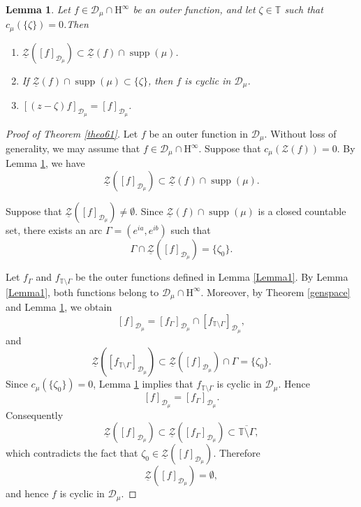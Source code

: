 \documentclass[12pt,reqno,a4paper]{amsart}
\newtheorem{lem}[prop]{Lemma}
\newcommand{\kH}{\mathrm{H^\infty  }}
\newcommand\TT{\mathbb{T}}
\DeclareMathOperator{\supp}{supp}
\newcommand{\cZ}{{\mathcal{Z}}}
\newcommand{\cD}{{\mathcal{D}}}
\numberwithin{equation}{section}
\begin{document}
	\begin{lem}\label{Lemma3}
		Let $f \in \cD_\mu \cap \kH$ be an outer function, and let $\zeta \in \TT$ such that $c_\mu(\{\zeta \})= 0$.Then\\
		
		\begin{enumerate}
			\item[A.] $\underline{\mathcal{Z}}([f]_{\cD_\mu}) \subset \underline{\mathcal{Z}}(f) \cap \supp(\mu)$.\\
			
			\item[B.] If $\underline{\mathcal{Z}}(f) \cap \supp(\mu) \subset \{\zeta\}$, then $f$ is cyclic in $\cD_\mu$.\\
			
			\item[C.] $[(z-\zeta)f]_{\cD_\mu}= [f]_{\cD_\mu}$.
		\end{enumerate}
	\end{lem}
	
	
	\begin{proof}[Proof of Theorem \ref{theo61}]
		
		Let $f$ be an outer function in $\cD_\mu$. Without loss of generality, we may assume that
		$f \in \cD_\mu \cap \kH$. Suppose that $c_\mu(\cZ(f))=0$. By Lemma \ref{Lemma3}, we have
		\[
		\underline{\mathcal Z}([f]_{\cD_\mu})
		\subset
		\underline{\mathcal Z}(f)\cap\supp(\mu).
		\]
		
		Suppose that
		$\underline{\mathcal Z}([f]_{\cD_\mu})\neq\emptyset$.
		Since
		$\underline{\mathcal Z}(f)\cap\supp(\mu)$
		is a closed countable set, there exists an arc
		$\Gamma=(e^{ia},e^{ib})$
		such that
		\[
		\Gamma\cap
		\underline{\mathcal Z}([f]_{\cD_\mu})
		=
		\{\zeta_0\}.
		\]
		
		Let $f_\Gamma$ and $f_{\TT\setminus\Gamma}$ be the outer functions defined in Lemma \ref{Lemma1}.
		By Lemma \ref{Lemma1}, both functions belong to $\cD_\mu\cap\kH$. Moreover, by
		Theorem \ref{genspace} and Lemma \ref{Lemma3}, we obtain
		\[
		[f]_{\cD_\mu}
		=
		[f_\Gamma]_{\cD_\mu}
		\cap
		[f_{\TT\setminus\Gamma}]_{\cD_\mu},
		\]
		and
		\[
		\underline{\mathcal Z}([f_{\TT\setminus\Gamma}]_{\cD_\mu})
		\subset
		\underline{\mathcal Z}([f]_{\cD_\mu})\cap\Gamma
		=
		\{\zeta_0\}.
		\]
		Since $c_\mu(\{\zeta_0\})=0$, Lemma \ref{Lemma3} implies that
		$f_{\TT\setminus\Gamma}$ is cyclic in $\cD_\mu$. Hence
		\[
		[f]_{\cD_\mu}
		=
		[f_\Gamma]_{\cD_\mu}.
		\]
		Consequently
		\[
		\underline{\mathcal Z}([f]_{\cD_\mu})
		\subset
		\underline{\mathcal Z}([f_\Gamma]_{\cD_\mu})
		\subset
		\overline{\TT\setminus\Gamma},
		\]
		which contradicts the fact that
		$\zeta_0\in
		\underline{\mathcal Z}([f]_{\cD_\mu})$.
		Therefore
		\[
		\underline{\mathcal Z}([f]_{\cD_\mu})=\emptyset,
		\]
		and hence $f$ is cyclic in $\cD_\mu$.
		
	\end{proof}
	
\end{document}
